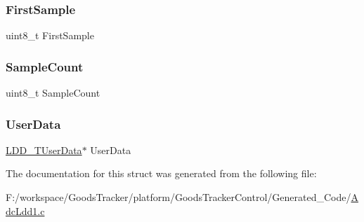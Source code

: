 \subsubsection{\texorpdfstring{First\+Sample}{FirstSample}}
{\footnotesize\ttfamily uint8\+\_\+t First\+Sample}

\mbox{\label{struct_adc_ldd1___t_device_data_adbc5a45964b0d935283b1ca894581823}} 
\subsubsection{\texorpdfstring{Sample\+Count}{SampleCount}}
{\footnotesize\ttfamily uint8\+\_\+t Sample\+Count}

\mbox{\label{struct_adc_ldd1___t_device_data_a849d3e0bc02b5dc79ba5b17a03bd2a28}} 
\subsubsection{\texorpdfstring{User\+Data}{UserData}}
{\footnotesize\ttfamily \hyperlink{group___p_e___types__module_ga0b66a73f87238a782318aa0be7578e35}{L\+D\+D\+\_\+\+T\+User\+Data}$\ast$ User\+Data}



The documentation for this struct was generated from the following file\+:\begin{DoxyCompactItemize}
\item 
F\+:/workspace/\+Goods\+Tracker/platform/\+Goods\+Tracker\+Control/\+Generated\+\_\+\+Code/\hyperlink{_adc_ldd1_8c}{Adc\+Ldd1.\+c}\end{DoxyCompactItemize}
